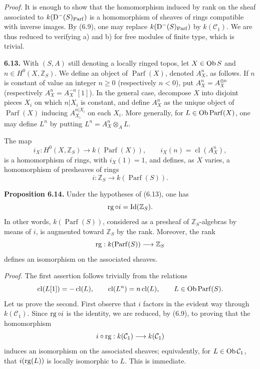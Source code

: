 \documentclass[11pt]{article}
\newcommand{\cl}{\operatorname{cl}}
\newcommand{\Parf}{\operatorname{Parf}}
\begin{document}
\providecommand{\End}{\operatorname{End}}
\providecommand{\tr}{\operatorname{tr}}

\emph{Proof.} It is enough to show that the homomorphism induced by rank on the sheaf associated to \(k(\Dpx^-(S)_{\Parf})\) is a homomorphism of sheaves of rings compatible with inverse images. By (6.9), one may replace \(k(\Dpx^-(S)_{\Parf})\) by \(k(\mathcal C_1)\). We are thus reduced to verifying a) and b) for free modules of finite type, which is trivial.

\textbf{6.13.} With \((S,A)\) still denoting a locally ringed topos, let \(X\in\operatorname{Ob} S\) and \(n\in H^0(X,\mathbb Z_S)\). We define an object of \(\Parf(X)\), denoted \(A_X^n\), as follows. If \(n\) is constant of value an integer \(n\geq0\) (respectively \(n<0\)), put \(A_X^n=A_X^{\oplus n}\) (respectively \(A_X^n=A_X^{-n}[1]\)). In the general case, decompose \(X\) into disjoint pieces \(X_i\) on which \(n|X_i\) is constant, and define \(A_X^n\) as the unique object of \(\Parf(X)\) inducing \(A_{X_i}^{n|X_i}\) on each \(X_i\). More generally, for \(L\in\Ob\Parf(X)\), one may define \(L^n\) by putting \(L^n=A_X^n\otimes_A L\).

The map
\[
  i_X:H^0(X,\mathbb Z_S)\longrightarrow k(\Parf(X)),
  \qquad i_X(n)=\cl(A_X^n),
\]
is a homomorphism of rings, with \(i_X(1)=1\), and defines, as \(X\) varies, a homomorphism of presheaves of rings
\[
  i:\mathbb Z_S\longrightarrow k(\Parf(S)).
\]

\textbf{Proposition 6.14.} Under the hypotheses of (6.13), one has
\[
  \operatorname{rg}\circ i=\operatorname{Id}(\mathbb Z_S).
\]
In other words, \(k(\Parf(S))\), considered as a presheaf of \(\mathbb Z_S\)-algebras by means of \(i\), is augmented toward \(\mathbb Z_S\) by the rank. Moreover, the rank
\[
  \rg:k(\Parf(S))\longrightarrow \mathbb Z_S
\]
defines an isomorphism on the associated sheaves.

\emph{Proof.} The first assertion follows trivially from the relations
\[
  \cl(L[1])=-\cl(L),\qquad \cl(L^n)=n\cl(L),
  \qquad L\in\Ob\Parf(S).
\]
Let us prove the second. First observe that \(i\) factors in the evident way through \(k(\mathcal C_1)\). Since \(\operatorname{rg}\circ i\) is the identity, we are reduced, by (6.9), to proving that the homomorphism
\[
  i\circ\operatorname{rg}:k(\mathcal C_1)\longrightarrow k(\mathcal C_1)
\]
induces an isomorphism on the associated sheaves; equivalently, for \(L\in\operatorname{Ob}\mathcal C_1\), that \(i(\operatorname{rg}(L))\) is locally isomorphic to \(L\). This is immediate.
\end{document}
